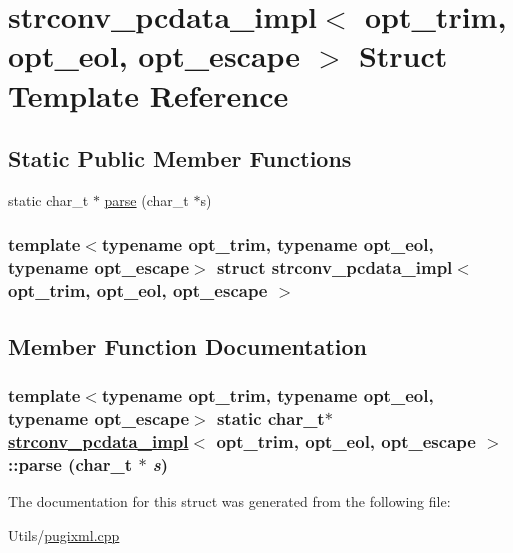 \hypertarget{structstrconv__pcdata__impl}{
\section{strconv\_\-pcdata\_\-impl$<$ opt\_\-trim, opt\_\-eol, opt\_\-escape $>$ Struct Template Reference}
\label{structstrconv__pcdata__impl}
}
\subsection*{Static Public Member Functions}
\begin{CompactItemize}
\item 
static char\_\-t $\ast$ \hyperlink{structstrconv__pcdata__impl_0bd2c80c1df06c93d77332a4bb63b5b8}{parse} (char\_\-t $\ast$s)
\end{CompactItemize}
\subsubsection*{template$<$typename opt\_\-trim, typename opt\_\-eol, typename opt\_\-escape$>$ struct strconv\_\-pcdata\_\-impl$<$ opt\_\-trim, opt\_\-eol, opt\_\-escape $>$}



\subsection{Member Function Documentation}
\hypertarget{structstrconv__pcdata__impl_0bd2c80c1df06c93d77332a4bb63b5b8}{
\subsubsection[parse]{\setlength{\rightskip}{0pt plus 5cm}template$<$typename opt\_\-trim, typename opt\_\-eol, typename opt\_\-escape$>$ static char\_\-t$\ast$ \hyperlink{structstrconv__pcdata__impl}{strconv\_\-pcdata\_\-impl}$<$ opt\_\-trim, opt\_\-eol, opt\_\-escape $>$::parse (char\_\-t $\ast$ {\em s})}}
\label{structstrconv__pcdata__impl_0bd2c80c1df06c93d77332a4bb63b5b8}




The documentation for this struct was generated from the following file:\begin{CompactItemize}
\item 
Utils/\hyperlink{pugixml_8cpp}{pugixml.cpp}\end{CompactItemize}
